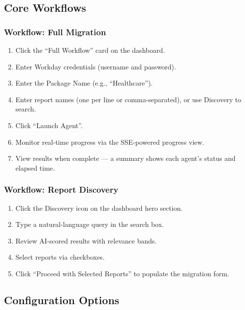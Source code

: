 \documentclass[12pt,a4paper]{article}
\begin{document}
\subsection{Core Workflows}
\label{subsec:core-workflows}

\subsubsection{Workflow: Full Migration}
\begin{enumerate}[leftmargin=2em]
  \item Click the ``Full Workflow'' card on the dashboard.
  \item Enter Workday credentials (username and password).
  \item Enter the Package Name (e.g., ``Healthcare'').
  \item Enter report names (one per line or comma-separated), or use Discovery to search.
  \item Click ``Launch Agent''.
  \item Monitor real-time progress via the SSE-powered progress view.
  \item View results when complete --- a summary shows each agent's status and elapsed time.
\end{enumerate}

\subsubsection{Workflow: Report Discovery}
\begin{enumerate}[leftmargin=2em]
  \item Click the Discovery icon on the dashboard hero section.
  \item Type a natural-language query in the search box.
  \item Review AI-scored results with relevance bands.
  \item Select reports via checkboxes.
  \item Click ``Proceed with Selected Reports'' to populate the migration form.
\end{enumerate}

\subsection{Configuration Options}
\label{subsec:config-options}
\end{document}
